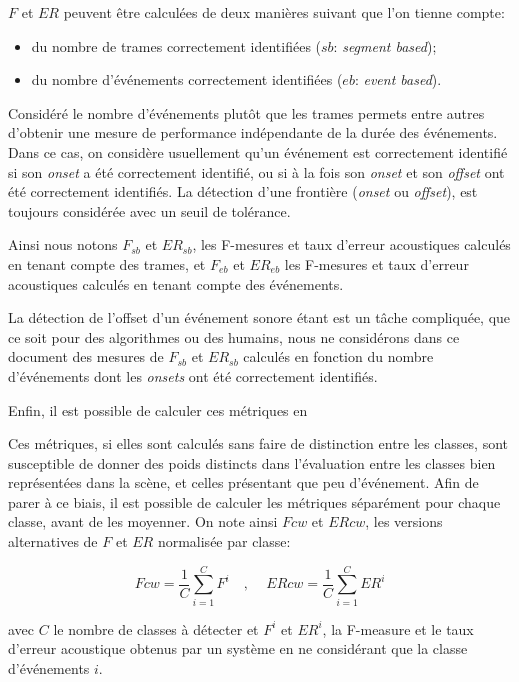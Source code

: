 $F$ et $ER$ peuvent être calculées de deux manières suivant que l'on tienne compte: 

\begin{itemize}
\item du nombre de trames correctement identifiées ($sb$: \emph{segment based});
\item du nombre d'événements correctement identifiées ($eb$: \emph{event based}).
\end{itemize}

Considéré le nombre d'événements plutôt que les trames permets entre autres d'obtenir une mesure de performance indépendante de la durée des événements. Dans ce cas, on considère usuellement qu'un événement est correctement identifié si son \emph{onset} a été correctement identifié, ou si à la fois son \emph{onset} et son \emph{offset} ont été correctement identifiés. La détection d'une frontière (\emph{onset} ou \emph{offset}), est toujours considérée avec un seuil de tolérance.

Ainsi nous notons $F_{sb}$ et $ER_{sb}$, les F-mesures et taux d'erreur acoustiques calculés en tenant compte des trames, et $F_{eb}$ et $ER_{eb}$ les F-mesures et taux d'erreur acoustiques calculés en tenant compte des événements.

La détection de l'offset d'un événement sonore étant est un tâche compliquée, que ce soit pour des algorithmes ou des humains, nous ne considérons dans ce document des mesures de $F_{sb}$ et $ER_{sb}$ calculés en fonction du nombre d'événements dont les \emph{onsets} ont été correctement identifiés.

Enfin, il est possible de calculer ces métriques en 

Ces métriques, si elles sont calculés sans faire de distinction entre les classes, sont susceptible de donner des poids distincts dans l'évaluation entre les classes bien représentées dans la scène, et celles présentant que peu d'événement. Afin de parer à ce biais, il est possible de calculer les métriques séparément pour chaque classe, avant de les moyenner. On note ainsi $Fcw$ et $ERcw$, les versions alternatives de $F$ et $ER$ normalisée par classe:

\begin{equation}
\label{eq:ch7_eq3}
Fcw=\dfrac{1}{C}\sum_{i=1}^C F^i \quad \textrm{, } \quad ERcw=\dfrac{1}{C}\sum_{i=1}^C ER^i
\end{equation}

avec $C$ le nombre de classes à détecter et $F^i$ et $ER^i$, la F-measure et le taux d'erreur acoustique obtenus par un système en ne considérant que la classe d'événements $i$. 

